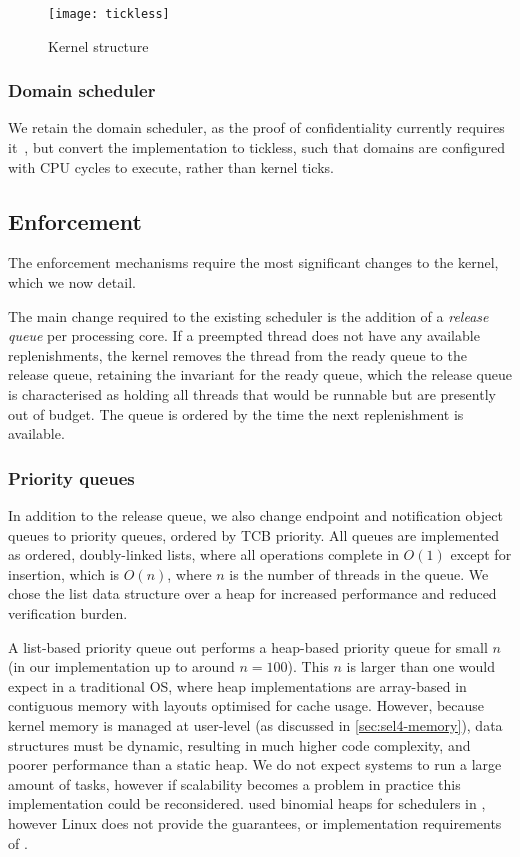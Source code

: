 \begin{figure}
    \centering 
    \texttt{[image: tickless]}
    \caption{Kernel structure}
    \label{figure:tickless}
\end{figure}

\subsubsection{Domain scheduler}

We retain the domain scheduler, as the proof of confidentiality currently requires
it~\citep{Murray_MBGBSLGK_13}, but convert the implementation to tickless, such that domains are
configured with CPU cycles to execute, rather than kernel ticks.

\subsection{Enforcement}

The enforcement mechanisms require the most significant changes to the kernel, which we now detail.

The main change required to the existing scheduler is the addition of a \emph{release queue} per
processing core. If a
preempted thread does not have any available replenishments, the kernel removes the thread from the
ready queue to the release queue, retaining the invariant for the ready queue, which the release
queue is characterised as holding all threads that would be runnable but are presently out of
budget. The queue is ordered by the time the next replenishment is available.

\subsubsection{Priority queues}

In addition to the release queue, we also change endpoint and notification object queues
to priority queues, ordered by \gls{TCB} priority. All queues are implemented as ordered, doubly-linked
lists, where all operations complete in $O(1)$ except for insertion, which is $O(n)$, where $n$ 
is the number of threads in the queue. 
We chose the list data structure over a heap for increased performance and reduced verification
burden.

A list-based priority queue out performs a heap-based priority queue for small $n$ (in our
implementation up to around $n = 100$).  This $n$ is larger than one would expect in a traditional
\gls{OS}, where heap implementations are array-based in contiguous memory with layouts optimised for
cache usage.  However, because \selfour kernel memory is
managed at user-level (as discussed in \cref{sec:sel4-memory}), data structures must be dynamic, 
resulting in much higher code complexity, and poorer performance than a static heap. 
We do not expect systems to run a large amount of tasks, however if scalability becomes a problem in
practice this implementation could be reconsidered. \citet{Brandenburg:phd} used
binomial heaps for schedulers in \litmus, however Linux does not provide the guarantees, or
implementation requirements of \selfour.

